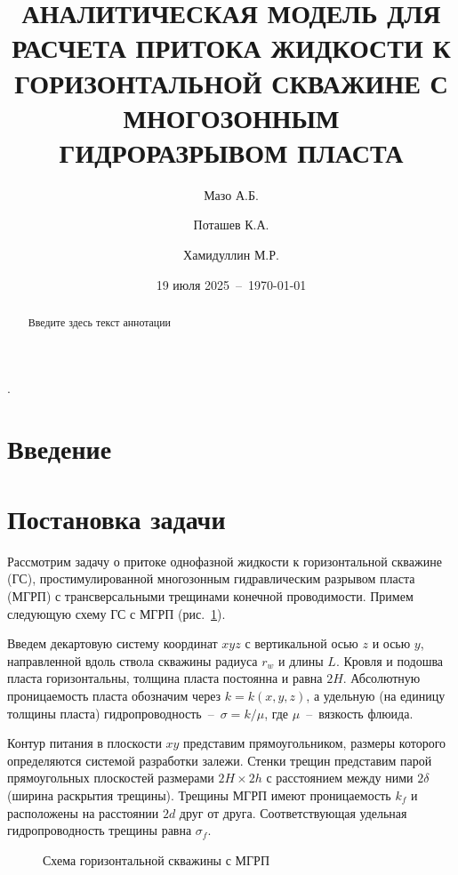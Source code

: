 \documentclass{article}
\title{АНАЛИТИЧЕСКАЯ МОДЕЛЬ ДЛЯ РАСЧЕТА ПРИТОКА ЖИДКОСТИ
К ГОРИЗОНТАЛЬНОЙ СКВАЖИНЕ С МНОГОЗОННЫМ ГИДРОРАЗРЫВОМ ПЛАСТА}
\author[1]{Мазо А.Б.}
\author[1]{Поташев К.А.}
\author[2]{Хамидуллин М.Р.}
\affil[1]{Казанский федеральный университет, Казань, Россия}
\affil[2]{Научно-исследовательский центр ``Курчатовский институт''}
\date{19 июля 2025~--~\today}
\begin{document}
\maketitle

\tableofcontents

\listoffigures

\listoftables.

\begin{abstract}
  Введите здесь текст аннотации
\end{abstract}

\section*{Введение}

\section{Постановка задачи}

Рассмотрим задачу о притоке однофазной жидкости к горизонтальной скважине (ГС),
простимулированной многозонным гидравлическим разрывом пласта (МГРП)
с трансверсальными трещинами конечной проводимости. Примем следующую схему
ГС с МГРП (рис.~\ref{fig:kham_main_scheme}).

Введем декартовую систему координат $xyz$ с вертикальной осью $z$ и осью $y$,
направленной вдоль ствола скважины радиуса $r_w$ и длины $L$.
Кровля и подошва пласта горизонтальны, толщина пласта постоянна и равна $2H$.
Абсолютную проницаемость пласта обозначим через $k=k\left(x,y,z\right)$,
а удельную (на единицу толщины пласта)
гидропроводность~--~$\sigma = k / \mu$, где $\mu$~--~вязкость флюида.

Контур питания в плоскости $xy$ представим прямоугольником, размеры которого
определяются системой разработки залежи. Стенки трещин представим парой
прямоугольных плоскостей размерами $2H \times 2h$ с расстоянием между
ними $2\delta$ (ширина раскрытия трещины). Трещины МГРП имеют проницаемость
$k_f$ и расположены на расстоянии $2d$ друг от друга. Соответствующая удельная гидропроводность трещины равна $\sigma_f$.

\begin{figure}[!ht]
  \centering
  
  \caption{\label{fig:kham_main_scheme}Схема горизонтальной скважины с МГРП}
\end{figure}
\end{document}
